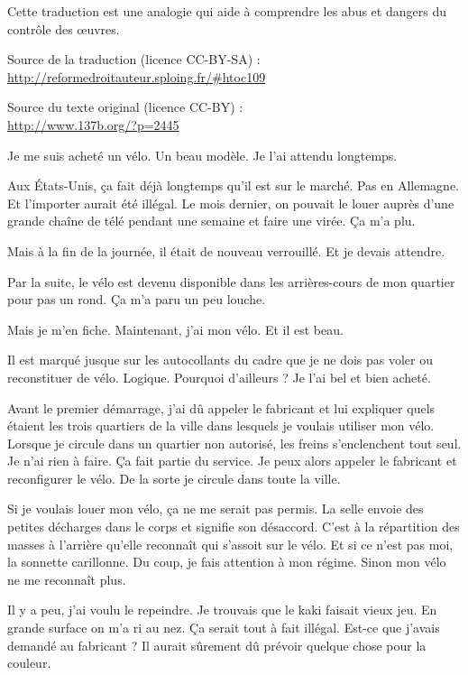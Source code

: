 Cette traduction est une analogie qui aide à comprendre les abus et dangers du contrôle des œuvres.

Source de la traduction (licence CC-BY-SA) :\\
\url{http://reformedroitauteur.sploing.fr/\#htoc109}

Source du texte original (licence CC-BY) :\\
\url{http://www.137b.org/?p=2445}

\newpage

Je me suis acheté un vélo. Un beau modèle. Je l’ai attendu longtemps.

Aux États-Unis, ça fait déjà longtemps qu’il est sur le marché. Pas en Allemagne. Et l'importer aurait été illégal. Le mois dernier, on pouvait le louer auprès d'une grande chaîne de télé pendant une semaine et faire une virée. Ça m'a plu.

Mais à la fin de la journée, il était de nouveau verrouillé. Et je devais attendre.

Par la suite, le vélo est devenu disponible dans les arrières-cours de mon quartier pour pas un rond. Ça m'a paru un peu louche.

Mais je m'en fiche. Maintenant, j'ai mon vélo. Et il est beau.

Il est marqué jusque sur les autocollants du cadre que je ne dois pas voler ou reconstituer de vélo. Logique. Pourquoi d'ailleurs ? Je l'ai bel et bien acheté.

Avant le premier démarrage, j'ai dû appeler le fabricant et lui expliquer quels étaient les trois quartiers de la ville dans lesquels je voulais utiliser mon vélo. Lorsque je circule dans un quartier non autorisé, les freins s'enclenchent tout seul. Je n'ai rien à faire. Ça fait partie du service. Je peux alors appeler le fabricant et reconfigurer le vélo. De la sorte je circule dans toute la ville.

Si je voulais louer mon vélo, ça ne me serait pas permis. La selle envoie des petites décharges dans le corps et signifie son désaccord. C'est à la répartition des masses à l'arrière qu'elle reconnaît qui s'assoit sur le vélo. Et si ce n'est pas moi, la sonnette carillonne. Du coup, je fais attention à mon régime. Sinon mon vélo ne me reconnaît plus.

Il y a peu, j'ai voulu le repeindre. Je trouvais que le kaki faisait vieux jeu. En grande surface on m'a ri au nez. Ça serait tout à fait illégal. Est-ce que j'avais demandé au fabricant ? Il aurait sûrement dû prévoir quelque chose pour la couleur.

